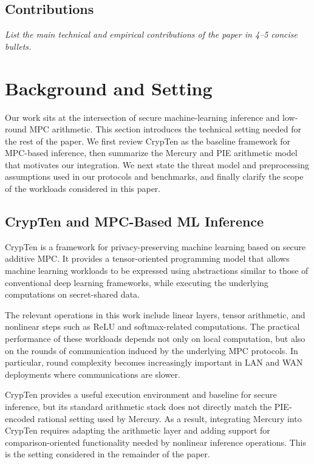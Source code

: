 \subsection{Contributions}
\textit{List the main technical and empirical contributions of the paper in 4--5 concise bullets.}

\section{Background and Setting}
\label{sec:background}

Our work sits at the intersection of secure machine-learning inference and low-round MPC arithmetic. This section introduces the technical setting needed for the rest of the paper. We first review CrypTen as the baseline framework for MPC-based inference, then summarize the Mercury and PIE arithmetic model that motivates our integration. We next state the threat model and preprocessing assumptions used in our protocols and benchmarks, and finally clarify the scope of the workloads considered in this paper.

\subsection{CrypTen and MPC-Based ML Inference}\label{sec:background-crypten}
CrypTen is a framework for privacy-preserving machine learning based on secure additive MPC. It provides a tensor-oriented programming model that allows machine learning workloads to be expressed using abstractions similar to those of conventional deep learning frameworks, while executing the underlying computations on secret-shared data.

The relevant operations in this work include linear layers, tensor arithmetic, and nonlinear steps such as ReLU and softmax-related computations. The practical performance of these workloads depends not only on local computation, but also on the rounds of communication induced by the underlying MPC protocols. In particular, round complexity becomes increasingly important in LAN and WAN deployments where communications are slower.

CrypTen provides a useful execution environment and baseline for secure inference, but its standard arithmetic stack does not directly match the PIE-encoded rational setting used by Mercury\cite{Harmon2023Mercury}. As a result, integrating Mercury into CrypTen requires adapting the arithmetic layer and adding support for comparison-oriented functionality needed by nonlinear inference operations. This is the setting considered in the remainder of the paper.

